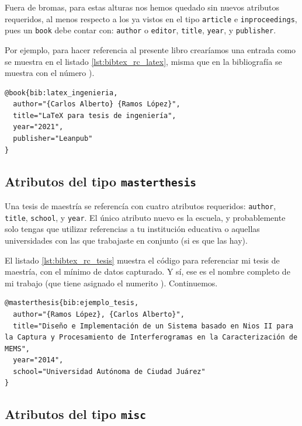 Fuera de bromas, para estas alturas nos hemos quedado sin nuevos atributos requeridos, al menos respecto a los ya vistos en el tipo \texttt{article} e \texttt{inproceedings}, pues un \texttt{book} debe contar con: \texttt{author} o \texttt{editor}, \texttt{title}, \texttt{year}, y \texttt{publisher}.

Por ejemplo, para hacer referencia al presente libro crearíamos una entrada como se muestra en el listado \ref{lst:bibtex_rc_latex}, misma que en la bibliografía se muestra con el número \cite{bib:latex_ingenieria}).

\begin{lstlisting}[style=bibtex,caption={Entrada de \BibTeX{} de un libro.},label=lst:bibtex_rc_latex]
@book{bib:latex_ingenieria,
  author="{Carlos Alberto} {Ramos López}",
  title="LaTeX para tesis de ingeniería",
  year="2021",
  publisher="Leanpub"
}
\end{lstlisting}



\subsection{Atributos del tipo \texttt{masterthesis}}



Una tesis de maestría se referencía con cuatro atributos requeridos: \texttt{author}, \texttt{title}, \texttt{school}, y \texttt{year}. El único atributo nuevo es la escuela, y probablemente solo tengas que utilizar referencias a tu institución educativa o aquellas universidades con las que trabajaste en conjunto (si es que las hay).

El listado \ref{lst:bibtex_rc_tesis} muestra el código para referenciar mi tesis de maestría, con el mínimo de datos capturado. Y sí, ese es el nombre completo de mi trabajo (que tiene asignado el numerito \cite{bib:ejemplo_tesis}). Continuemos.

\begin{lstlisting}[style=bibtex,caption={Entrada de una tesis de maestría.},label=lst:bibtex_rc_tesis]
@masterthesis{bib:ejemplo_tesis,
  author="{Ramos López}, {Carlos Alberto}",
  title="Diseño e Implementación de un Sistema basado en Nios II para la Captura y Procesamiento de Interferogramas en la Caracterización de MEMS",
  year="2014",
  school="Universidad Autónoma de Ciudad Juárez"
}
\end{lstlisting}



\subsection{Atributos del tipo \texttt{misc}}



